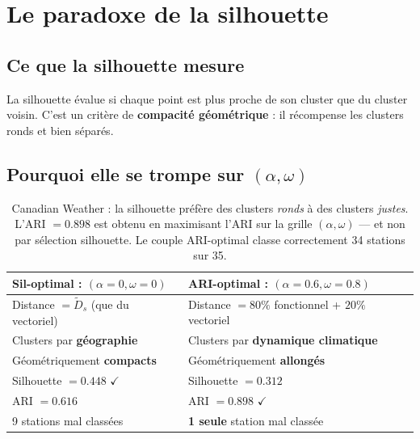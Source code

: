 \documentclass[11pt, a4paper]{article}
\begin{document}
\newpage
\section{Le paradoxe de la silhouette}

\subsection{Ce que la silhouette mesure}

La silhouette évalue si chaque point est plus proche de son cluster que du
cluster voisin. C'est un critère de \textbf{compacité géométrique} : il
récompense les clusters ronds et bien séparés.

\subsection{Pourquoi elle se trompe sur $(\alpha, \omega)$}

\begin{table}[H]
\centering
\renewcommand{\arraystretch}{1.3}
\begin{tabular}{p{5.5cm} p{5.5cm}}
  \toprule
  \textbf{Sil-optimal : $(\alpha{=}0, \omega{=}0)$} &
  \textbf{ARI-optimal : $(\alpha{=}0.6, \omega{=}0.8)$} \\
  \midrule
  Distance $= \tilde{D}_s$ (que du vectoriel) &
  Distance $= 80\%$ fonctionnel + $20\%$ vectoriel \\[4pt]
  Clusters par \textbf{géographie} &
  Clusters par \textbf{dynamique climatique} \\[4pt]
  Géométriquement \textbf{compacts} &
  Géométriquement \textbf{allongés} \\[4pt]
  Silhouette $= 0.448$ \textcolor{mix}{$\boldsymbol{\checkmark}$} &
  Silhouette $= 0.312$ \\[4pt]
  ARI $= 0.616$ &
  ARI $= 0.898$ \textcolor{mix}{$\boldsymbol{\checkmark}$} \\[2pt]
  \small 9 stations mal classées &
  \small \textbf{1 seule} station mal classée \\
  \bottomrule
\end{tabular}
\caption{Canadian Weather : la silhouette préfère des clusters \emph{ronds}
à des clusters \emph{justes}. L'ARI $= 0.898$ est obtenu en maximisant l'ARI
sur la grille $(\alpha, \omega)$ — et non par sélection silhouette. Le couple
ARI-optimal classe correctement 34 stations sur 35.}
\end{table}
\end{document}
